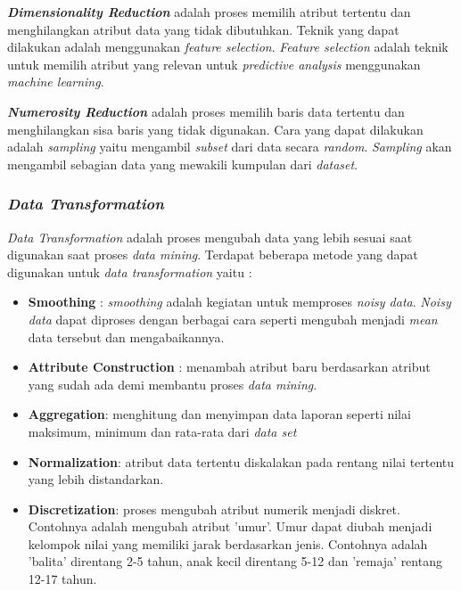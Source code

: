 \documentclass[a4paper,twoside]{article}
\begin{document}
\begin{enumerate}
\textbf{\textit{Dimensionality Reduction}} adalah proses memilih atribut tertentu dan menghilangkan atribut data yang tidak dibutuhkan. Teknik yang dapat dilakukan adalah menggunakan \textit{feature selection}. \textit{Feature selection} adalah teknik untuk memilih atribut yang relevan untuk \textit{predictive analysis} menggunakan \textit{machine learning}.

\textbf{\textit{Numerosity Reduction}} adalah proses memilih baris data tertentu dan menghilangkan sisa baris yang tidak digunakan. Cara yang dapat dilakukan adalah \textit{sampling} yaitu mengambil \textit{subset} dari data secara \textit{random}. \textit{Sampling} akan mengambil sebagian data yang mewakili kumpulan dari \textit{dataset}. 

\subsubsection{\textit{Data Transformation}}
\textit{Data Transformation} adalah proses mengubah data yang lebih sesuai saat digunakan saat proses \textit{data mining}. Terdapat beberapa metode yang dapat digunakan untuk \textit{data transformation} yaitu : 

\begin{itemize}
\item \textbf{Smoothing} : \textit{smoothing} adalah kegiatan untuk memproses \textit{noisy data}. \textit{Noisy data} dapat diproses dengan berbagai cara seperti mengubah menjadi \textit{mean} data tersebut dan mengabaikannya.
\item \textbf{Attribute Construction} : menambah atribut baru berdasarkan atribut yang sudah ada demi membantu proses \textit{data mining}. 
\item \textbf{Aggregation}: menghitung dan menyimpan data laporan seperti nilai maksimum, minimum dan rata-rata dari \textit{data set}
\item \textbf{Normalization}: atribut data tertentu diskalakan pada rentang nilai tertentu yang lebih distandarkan.
\item \textbf{Discretization}: proses mengubah atribut numerik menjadi diskret. Contohnya adalah mengubah  atribut 'umur'. Umur dapat diubah menjadi kelompok nilai yang memiliki jarak  berdasarkan jenis. Contohnya adalah 'balita' direntang 2-5 tahun, anak kecil direntang 5-12 dan 'remaja' rentang 12-17 tahun. 
\end{itemize}



\end{enumerate}
\end{document}
